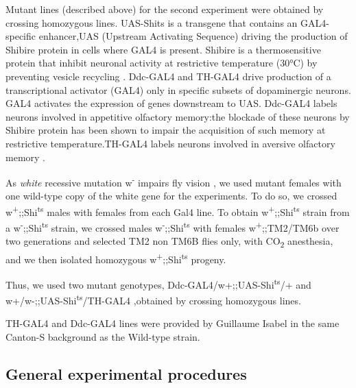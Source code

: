 \documentclass[a4paper, 12pt]{article}
\begin{document}
	
	Mutant lines (described above) for the second experiment were obtained by crossing homozygous lines.
	UAS-Shits is a transgene that contains an GAL4-specific enhancer,UAS (Upstream Activating Sequence) driving the production of Shibire protein in cells where GAL4 is present. Shibire is a thermosensitive protein that inhibit neuronal activity at restrictive temperature (30°C) by preventing vesicle recycling \parencite{kitamoto_conditional_2001}. Ddc-GAL4 and TH-GAL4 drive production of a transcriptional activator (GAL4) only in specific subsets of dopaminergic neurons. GAL4 activates the expression of genes downstream to UAS. Ddc-GAL4 labels neurons involved in appetitive olfactory memory:the blockade of these neurons by Shibire protein has been shown to impair the acquisition of such memory at restrictive temperature\parencite{kosaka_reversible_1983}.TH-GAL4 labels neurons involved in aversive olfactory memory \parencite{liu_subset_2012}.
	
	As \textit{white} recessive mutation w\textsuperscript{-} impairs fly vision \parencite{gotz_optomotorische_1964}, we used mutant females with one wild-type copy of the white gene for the experiments. To do so, we crossed w\textsuperscript{+};;Shi\textsuperscript{ts} males with females from each Gal4 line. To obtain w\textsuperscript{+};;Shi\textsuperscript{ts} strain from a w\textsuperscript{-};;Shi\textsuperscript{ts} strain, we crossed males w\textsuperscript{-};;Shi\textsuperscript{ts} with females w\textsuperscript{+};;TM2/TM6b over two generations and selected TM2 non TM6B flies only, with CO\textsubscript{2} anesthesia, and we then isolated homozygous w\textsuperscript{+};;Shi\textsuperscript{ts} progeny.
	
	Thus, we used two mutant genotypes, Ddc-GAL4/w+;;UAS-Shi\textsuperscript{ts}/+ and w+/w-;;UAS-Shi\textsuperscript{ts}/TH-GAL4 ,obtained by crossing homozygous lines. 
	
	TH-GAL4 and Ddc-GAL4 lines were provided by Guillaume Isabel in the same Canton-S background as the Wild-type strain.


	\subsection{General experimental procedures}
	
\end{document}
